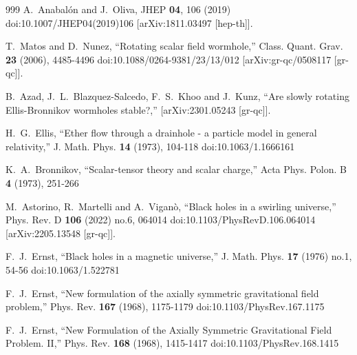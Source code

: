\documentclass[aps,preprint,groupedaddress,nofootinbib,superscriptaddress,showkeys,showpacs,eqsecnum,amsmath,amssymb]{revtex4-1}
\begin{document}
\begin{thebibliography}{999}
A.~Anabal\'on and J.~Oliva,
JHEP \textbf{04}, 106 (2019)
doi:10.1007/JHEP04(2019)106
[arXiv:1811.03497 [hep-th]].





T.~Matos and D.~Nunez,
``Rotating scalar field wormhole,''
Class. Quant. Grav. \textbf{23} (2006), 4485-4496
doi:10.1088/0264-9381/23/13/012
[arXiv:gr-qc/0508117 [gr-qc]].




B.~Azad, J.~L.~Blazquez-Salcedo, F.~S.~Khoo and J.~Kunz,
``Are slowly rotating Ellis-Bronnikov wormholes stable?,''
[arXiv:2301.05243 [gr-qc]].

H.~G.~Ellis,
``Ether flow through a drainhole - a particle model in general relativity,''
J. Math. Phys. \textbf{14} (1973), 104-118
doi:10.1063/1.1666161

K.~A.~Bronnikov,
``Scalar-tensor theory and scalar charge,''
Acta Phys. Polon. B \textbf{4} (1973), 251-266

M.~Astorino, R.~Martelli and A.~Vigan\`o,
``Black holes in a swirling universe,''
Phys. Rev. D \textbf{106} (2022) no.6, 064014
doi:10.1103/PhysRevD.106.064014
[arXiv:2205.13548 [gr-qc]].

F.~J.~Ernst,
``Black holes in a magnetic universe,''
J. Math. Phys. \textbf{17} (1976) no.1, 54-56
doi:10.1063/1.522781


F.~J.~Ernst,
``New formulation of the axially symmetric gravitational field problem,''
Phys. Rev. \textbf{167} (1968), 1175-1179
doi:10.1103/PhysRev.167.1175

F.~J.~Ernst,
``New Formulation of the Axially Symmetric Gravitational Field Problem. II,''
Phys. Rev. \textbf{168} (1968), 1415-1417
doi:10.1103/PhysRev.168.1415



\end{thebibliography}
\end{document}
